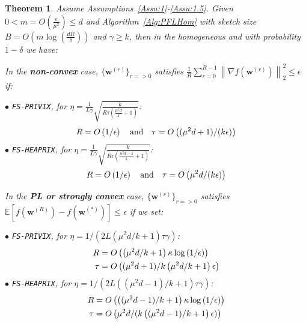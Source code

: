 \documentclass[twoside]{article}
\newtheorem{theorem}{Theorem}
\begin{document}
\begin{theorem}\label{thm:homog_case}
Assume Assumptions~\ref{Assu:1}-\ref{Assu:1.5}. 
Given $0<m=O\left(\frac{e}{\mu^2}\right)\leq d$ and Algorithm~\ref{Alg:PFLHom} with sketch size $B=O\left(m\log\left(\frac{d R}{\delta}\right)\right)$ and $\gamma\geq k$, then in the homogeneous and with probability $1-\delta$ we have:

In the \textbf{non-convex} case, $\{ {\boldsymbol{w}}^{(r)}\}_{r=>0}$ satisfies  $\frac{1}{R}\sum_{r=0}^{R-1}\left\|\nabla f({\boldsymbol{w}}^{(r)})\right\|_2^2\leq {\epsilon}$ if: 
 
\noindent $\bullet$ \texttt{FS-PRIVIX}, for $\eta=\frac{1}{L\gamma}\sqrt{\frac{k}{R\tau\left(\frac{\mu^2d}{k}+1\right)}}$:    
\begin{equation}\notag
R=O\left(1/\epsilon\right) \quad \textrm{and} \quad \tau=O\left((\mu^2d+1)/(k\epsilon)\right)
 \end{equation}
\noindent $\bullet$ \texttt{FS-HEAPRIX}, for $\eta=\frac{1}{L\gamma}\sqrt{\frac{k}{R\tau\left(\frac{\mu^2d-1}{k}+1\right)}}$:
\begin{equation}\notag
R=O\left(1/\epsilon\right) \quad \textrm{and} \quad \tau=O\left(\mu^2d/(k\epsilon)\right)
 \end{equation}

 
In the \textbf{PL or strongly convex} case, $\{ {\boldsymbol{w}}^{(r)}\}_{r=>0}$ satisfies $\mathbb{E}[f({\boldsymbol{w}}^{(R)})-f({\boldsymbol{w}}^{(*)})]\leq \epsilon$ if  we set:  

\noindent $\bullet$ \texttt{FS-PRIVIX}, for $\eta=1/(2L(\mu^2d/k+1)\tau\gamma)$:    
\begin{equation}\notag
\begin{split}
R&=O\left(\left(\mu^2d/k+1\right)\kappa\log\left(1/\epsilon\right)\right)\\
\tau&=O\left((\mu^2d+1)/k\left(\mu^2d/k+1\right)\epsilon\right)
  \end{split}
 \end{equation}
\noindent $\bullet$ \texttt{FS-HEAPRIX}, for $\eta=1/(2L((\mu^2d-1)/k+1)\tau\gamma)$:    
\begin{equation}\notag
\begin{split}
R& = O\left(\left((\mu^2d-1)/k+1\right)\kappa\log\left(1/\epsilon\right)\right)\\
 \tau &=O\left(\mu^2d/(k\left((\mu^2d-1)/k+1\right)\epsilon)\right)
  \end{split}
 \end{equation}


\end{theorem}
\end{document}
